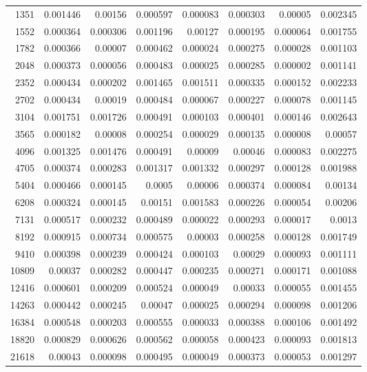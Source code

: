 \begin{longtable}{r r r r r r r r}
1351 & 0.001446 & 0.00156 & 0.000597 & 0.000083 & 0.000303 & 0.00005 & 0.002345 \\
1552 & 0.000364 & 0.000306 & 0.001196 & 0.00127 & 0.000195 & 0.000064 & 0.001755 \\
1782 & 0.000366 & 0.00007 & 0.000462 & 0.000024 & 0.000275 & 0.000028 & 0.001103 \\
2048 & 0.000373 & 0.000056 & 0.000483 & 0.000025 & 0.000285 & 0.000002 & 0.001141 \\
2352 & 0.000434 & 0.000202 & 0.001465 & 0.001511 & 0.000335 & 0.000152 & 0.002233 \\
2702 & 0.000434 & 0.00019 & 0.000484 & 0.000067 & 0.000227 & 0.000078 & 0.001145 \\
3104 & 0.001751 & 0.001726 & 0.000491 & 0.000103 & 0.000401 & 0.000146 & 0.002643 \\
3565 & 0.000182 & 0.00008 & 0.000254 & 0.000029 & 0.000135 & 0.000008 & 0.00057 \\
4096 & 0.001325 & 0.001476 & 0.000491 & 0.00009 & 0.00046 & 0.000083 & 0.002275 \\
4705 & 0.000374 & 0.000283 & 0.001317 & 0.001332 & 0.000297 & 0.000128 & 0.001988 \\
5404 & 0.000466 & 0.000145 & 0.0005 & 0.00006 & 0.000374 & 0.000084 & 0.00134 \\
6208 & 0.000324 & 0.000145 & 0.00151 & 0.001583 & 0.000226 & 0.000054 & 0.00206 \\
7131 & 0.000517 & 0.000232 & 0.000489 & 0.000022 & 0.000293 & 0.000017 & 0.0013 \\
8192 & 0.000915 & 0.000734 & 0.000575 & 0.00003 & 0.000258 & 0.000128 & 0.001749 \\
9410 & 0.000398 & 0.000239 & 0.000424 & 0.000103 & 0.00029 & 0.000093 & 0.001111 \\
10809 & 0.00037 & 0.000282 & 0.000447 & 0.000235 & 0.000271 & 0.000171 & 0.001088 \\
12416 & 0.000601 & 0.000209 & 0.000524 & 0.000049 & 0.00033 & 0.000055 & 0.001455 \\
14263 & 0.000442 & 0.000245 & 0.00047 & 0.000025 & 0.000294 & 0.000098 & 0.001206 \\
16384 & 0.000548 & 0.000203 & 0.000555 & 0.000033 & 0.000388 & 0.000106 & 0.001492 \\
18820 & 0.000829 & 0.000626 & 0.000562 & 0.000058 & 0.000423 & 0.000093 & 0.001813 \\
21618 & 0.00043 & 0.000098 & 0.000495 & 0.000049 & 0.000373 & 0.000053 & 0.001297 \\

\end{longtable}
